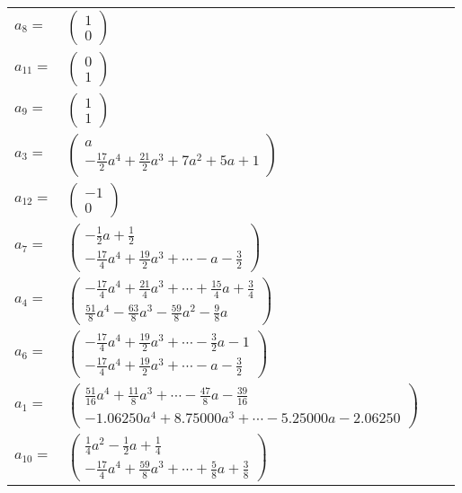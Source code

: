\documentclass[1p]{elsarticle_modified}
\theoremstyle{definition}
\begin{document}
\begin{tabular}{m{7pt} m{180pt} m{7pt} m{180pt} }
\flushright $a_{8}=$&$\begin{pmatrix}1\\0\end{pmatrix}$ \\
\flushright $a_{11}=$&$\begin{pmatrix}0\\1\end{pmatrix}$ \\
\flushright $a_{9}=$&$\begin{pmatrix}1\\1\end{pmatrix}$ \\
\flushright $a_{3}=$&$\begin{pmatrix}a\\-\frac{17}{2} a^4+\frac{21}{2} a^3+7 a^2+5 a+1\end{pmatrix}$ \\
\flushright $a_{12}=$&$\begin{pmatrix}-1\\0\end{pmatrix}$ \\
\flushright $a_{7}=$&$\begin{pmatrix}-\frac{1}{2} a+\frac{1}{2}\\-\frac{17}{4} a^4+\frac{19}{2} a^3+\cdots- a-\frac{3}{2}\end{pmatrix}$ \\
\flushright $a_{4}=$&$\begin{pmatrix}-\frac{17}{4} a^4+\frac{21}{4} a^3+\cdots+\frac{15}{4} a+\frac{3}{4}\\\frac{51}{8} a^4-\frac{63}{8} a^3-\frac{59}{8} a^2-\frac{9}{8} a\end{pmatrix}$ \\
\flushright $a_{6}=$&$\begin{pmatrix}-\frac{17}{4} a^4+\frac{19}{2} a^3+\cdots-\frac{3}{2} a-1\\-\frac{17}{4} a^4+\frac{19}{2} a^3+\cdots- a-\frac{3}{2}\end{pmatrix}$ \\
\flushright $a_{1}=$&$\begin{pmatrix}\frac{51}{16} a^4+\frac{11}{8} a^3+\cdots-\frac{47}{8} a-\frac{39}{16}\\-1.06250 a^{4}+8.75000 a^{3}+\cdots-5.25000 a-2.06250\end{pmatrix}$ \\
\flushright $a_{10}=$&$\begin{pmatrix}\frac{1}{4} a^2-\frac{1}{2} a+\frac{1}{4}\\-\frac{17}{4} a^4+\frac{59}{8} a^3+\cdots+\frac{5}{8} a+\frac{3}{8}\end{pmatrix}$ \\

\end{tabular}
\end{document}
